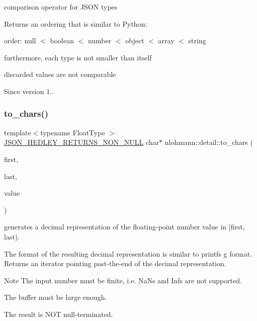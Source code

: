 comparison operator for J\+S\+ON types 

Returns an ordering that is similar to Python\+:
\begin{DoxyItemize}
\item order\+: null $<$ boolean $<$ number $<$ object $<$ array $<$ string
\item furthermore, each type is not smaller than itself
\item discarded values are not comparable
\end{DoxyItemize}

\begin{DoxySince}{Since}
version 1.. 
\end{DoxySince}
\mbox{\label{namespacenlohmann_1_1detail_a6cca370ac6c99294dbe4fe24716a57dd}} 
\subsubsection{\texorpdfstring{to\_chars()}{to\_chars()}}
{\footnotesize\ttfamily template$<$typename Float\+Type $>$ \\
\mbox{\hyperlink{json_8hpp_a5f2aaec3b681d0a72f7d6e90b70cdcd1}{J\+S\+O\+N\+\_\+\+H\+E\+D\+L\+E\+Y\+\_\+\+R\+E\+T\+U\+R\+N\+S\+\_\+\+N\+O\+N\+\_\+\+N\+U\+LL}} char$\ast$ nlohmann\+::detail\+::to\+\_\+chars (\begin{DoxyParamCaption}\item[{char $\ast$}]{first,  }\item[{const char $\ast$}]{last,  }\item[{Float\+Type}]{value }\end{DoxyParamCaption})}



generates a decimal representation of the floating-\/point number value in \mbox{[}first, last). 

The format of the resulting decimal representation is similar to printf\textquotesingle{}s g format. Returns an iterator pointing past-\/the-\/end of the decimal representation.

\begin{DoxyNote}{Note}
The input number must be finite, i.\+e. NaN\textquotesingle{}s and Inf\textquotesingle{}s are not supported. 

The buffer must be large enough. 

The result is N\+OT null-\/terminated. 
\end{DoxyNote}
\mbox{\label{namespacenlohmann_1_1detail_a1a804b98cbe89b7e44b698f2ca860490}} 
